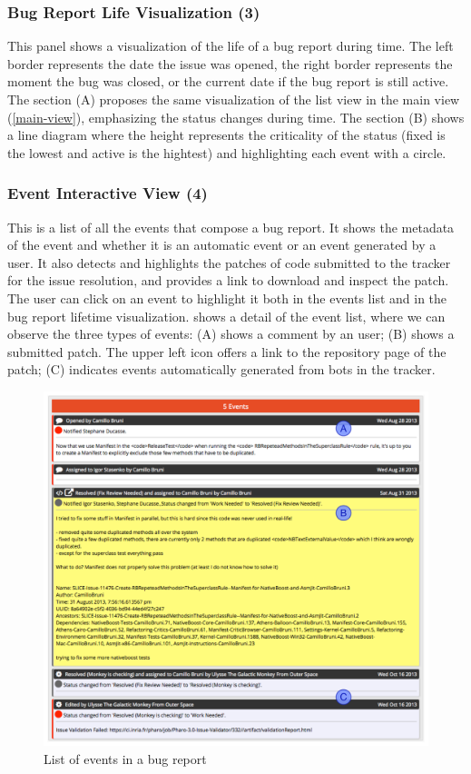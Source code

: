 \subsubsection{Bug Report Life Visualization (3)}
This panel shows a visualization of the life of a bug report during time.
The left border represents the date the issue was opened, the right border represents the moment the bug was closed, or the current date if the bug report is still active.
The section (A) proposes the same visualization of the list view in the main view (\ref{main-view}), emphasizing the status changes during time.
The section (B) shows a line diagram where the height represents the criticality of the status (\ie fixed is the lowest and active is the hightest) and highlighting each event with a circle.

\subsubsection{Event Interactive View (4)}
This is a list of all the events that compose a bug report.
It shows the metadata of the event and whether it is an automatic event or an event generated by a user.
It also detects and highlights the patches of code submitted to the tracker for the issue resolution, and provides a link to download and inspect the patch.
The user can click on an event to highlight it both in the events list and in the bug report lifetime visualization.
 shows a detail of the event list, where we can observe the three types of events: (A) shows a comment by an user; (B) shows a submitted patch.
The upper left icon offers a link to the repository page of the patch; (C) indicates events automatically generated from bots in the tracker.
\\
\begin{figure}[ht]
\begin{center}
\includegraphics[width=\linewidth]{Images/visualize/event-list.pdf}
\caption{List of events in a bug report}
\label{fig-event-list}
\end{center}
\end{figure}
